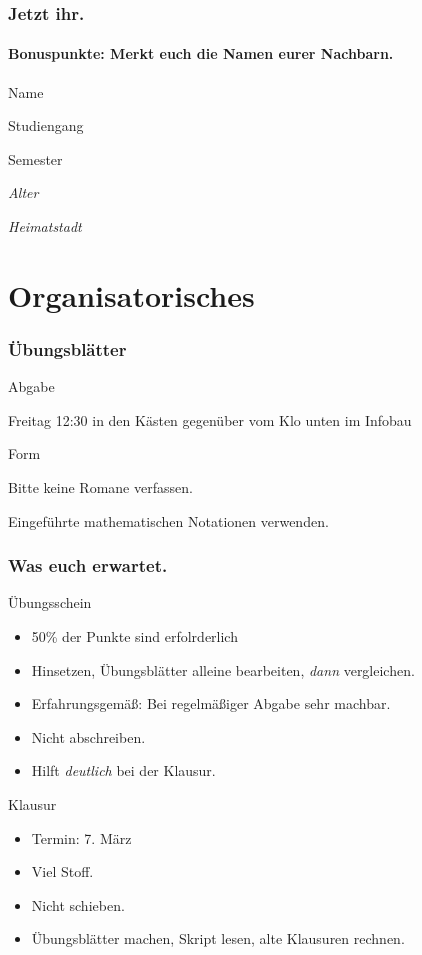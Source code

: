 \documentclass{beamer}
\begin{document}
\begin{frame}
  \frametitle{Jetzt ihr.}
  \framesubtitle{Bonuspunkte: Merkt euch die Namen eurer Nachbarn.}
  \begin{description}
    \item Name
    \item Studiengang
    \item Semester
    \item {\small \textit{Alter}}
    \item {\small \textit{Heimatstadt}}
  \end{description}
\end{frame}

\section{Organisatorisches}
\begin{frame}
  \frametitle{Übungsblätter}
  \begin{block}{Abgabe}
    \begin{description}
      \item{\LARGE Freitag 12:30} in den Kästen gegenüber vom Klo unten im Infobau
    \end{description}
  \end{block}
  \begin{block}{Form}
    \begin{description}
      \item Bitte {\LARGE keine} Romane verfassen.
      \item Eingeführte mathematischen Notationen verwenden.
    \end{description}
  \end{block}
\end{frame}

\begin{frame}
  \frametitle{Was euch erwartet.}
  \begin{block}{Übungsschein}
    \begin{itemize}
      \item 50\% der Punkte sind erfolrderlich
      \item Hinsetzen, Übungsblätter alleine bearbeiten, \emph{dann} vergleichen.
      \item Erfahrungsgemäß: Bei regelmäßiger Abgabe sehr machbar.
      \item Nicht abschreiben.
      \item Hilft \emph{deutlich} bei der Klausur.
    \end{itemize}
  \end{block}
  \begin{block}{Klausur}
    \begin{itemize}
      \item Termin: 7. März
      \item {\LARGE Viel} Stoff.
      \item {\LARGE Nicht schieben.}
      \item Übungsblätter machen, Skript lesen, alte Klausuren rechnen.
    \end{itemize}
  \end{block}
\end{frame}
\end{document}
